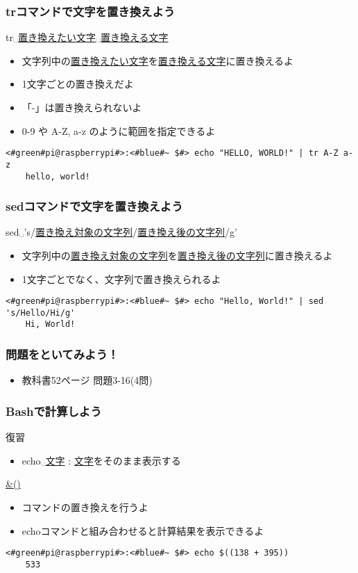 \begin{frame}[fragile]
    \frametitle{trコマンドで文字を置き換えよう}
    tr␣\underline{置き換えたい文字}␣\underline{置き換える文字}
    \begin{itemize}
        \item 文字列中の\underline{置き換えたい文字}を\underline{置き換える文字}に置き換えるよ
        \item 1文字ごとの置き換えだよ
        \item 「-」は置き換えられないよ
        \item 0-9 や A-Z, a-z のように範囲を指定できるよ
    \end{itemize}
    \begin{lstlisting}[title=範囲指定を使った置き換え, label=tr_range]
    <#green#pi@raspberrypi#>:<#blue#~ $#> echo "HELLO, WORLD!" | tr A-Z a-z
    hello, world!
    \end{lstlisting}
\end{frame}

\begin{frame}[fragile]
    \frametitle{sedコマンドで文字を置き換えよう}
    sed␣'s/\underline{置き換え対象の文字列}/\underline{置き換え後の文字列}/g'
    \begin{itemize}
        \item 文字列中の\underline{置き換え対象の文字列}を\underline{置き換え後の文字列}に置き換えるよ
        \item 1文字ごとでなく、文字列で置き換えられるよ
    \end{itemize}
    \begin{lstlisting}[title=sed sedでの文字の置き換え, label=sed_app]
    <#green#pi@raspberrypi#>:<#blue#~ $#> echo "Hello, World!" | sed 's/Hello/Hi/g'
    Hi, World!
    \end{lstlisting}
\end{frame}

\begin{frame}
    \frametitle{問題をといてみよう！}
    \begin{itemize}
        \item 教科書52ページ 問題3-16(4問)
    \end{itemize}
\end{frame}

\begin{frame}[fragile]
    \frametitle{Bashで計算しよう}
    復習
    \begin{itemize}
        \item echo␣\underline{文字} : \underline{文字}をそのまま表示する
    \end{itemize}
    \underline{\&()}
    \begin{itemize}
        \item コマンドの置き換えを行うよ
        \item echoコマンドと組み合わせると計算結果を表示できるよ
    \end{itemize}
    \begin{lstlisting}[title=echo コマンドでの計算, label=cmdsbs:calc]
    <#green#pi@raspberrypi#>:<#blue#~ $#> echo $((138 + 395))
    533
    \end{lstlisting}
\end{frame}

